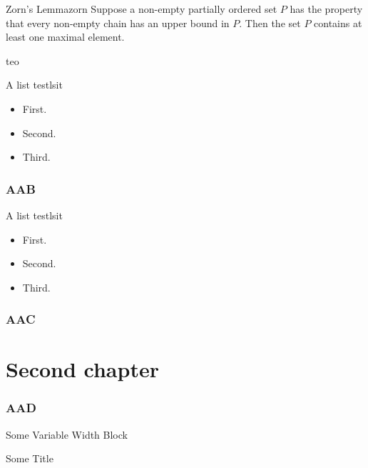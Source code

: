 \documentclass[twoside]{libro-matua}
\begin{document}
\begin{lema}{Zorn's Lemma}{zorn}
Suppose a non-empty partially ordered set $P$ has the property that every non-empty chain has an upper bound in $P$. Then the set $P$ contains at least one maximal element.
\end{lema}
\begin{teo}{}{teo}
\lipsum[2]
\end{teo}
\begin{lema}{A list test}{lsit}
\begin{itemize}
\item First.
\item Second.
\item Third.
\end{itemize}
\end{lema}

\subsection{AAB}
\lipsum
\begin{lema}{A list test}{lsit}
\begin{itemize}
\item First.
\item Second.
\item Third.
\end{itemize}
\end{lema}
\subsection{AAC}
\begin{nota}
\lipsum
\end{nota}
\lipsum[4]
\chapter{Second chapter}
\PartialToc
\subsection{AAD}
\begin{MyBlock}{Some Variable Width Block}
\lipsum[4]
\end{MyBlock}

\begin{MyBlock}[.5\linewidth]{Some Title}
\lipsum[4]
\end{MyBlock}
\lipsum
\end{document}
